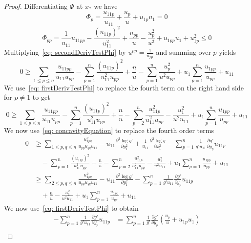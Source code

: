 \documentclass[10pt,a4paper]{amsart}
\newcommand{\del}{\partial}
\numberwithin{equation}{section}
\begin{document}
\begin{proof}
Differentiating $\Phi$ at $x_*$ we have
\begin{equation}\label{eq: firstDerivTestPhi}
\Phi_{p} = \frac{u_{11p}}{u_{11}} + \frac{u_p}{u} + u_{1p}u_1=0
\end{equation}
\begin{equation}\label{eq: secondDerivTestPhi}
 \Phi_{pp} = \frac{1}{u_{11}}u_{11pp}-\frac{(u_{11p})^2}{u_{11}^2} + \frac{u_{pp}}{u} - \frac{u_p^2}{u^2} + u_{1pp}u_1 + u_{1p}^2 \leq0
\end{equation}
Multiplying~\eqref{eq: secondDerivTestPhi} by $u^{pp}= \frac{1}{u_{pp}}$ and summing over $p$ yields
\[
0 \geq \sum_{1\leq p\leq n} \frac{u_{11pp}}{u_{11}u_{pp}}-\sum_{p=1}^{n}\frac{(u_{11p})^2}{u_{11}^2u_{pp}} + \frac{n}{u} - \sum_{p=1}^{n}\frac{u_p^2}{u^2u_{pp}} + u_{1}\sum_{p=1}^{n}\frac{u_{1pp}}{u_{pp}} + u_{11} 
\]
We use~\eqref{eq: firstDerivTestPhi} to replace the fourth term on the right hand side for $p\ne 1$ to get
\[
0 \geq \sum_{1\leq p\leq n} \frac{u_{11pp}}{u_{11}u_{pp}}-\sum_{p=1}^{n}\frac{(u_{11p})^2}{u_{11}^2u_{pp}} + \frac{n}{u} - \sum_{p=2}^{n}\frac{u_{11p}^2}{u_{11}^2u_{pp}}-\frac{u_1^2}{u^2u_{11}} + u_{1}\sum_{p=1}^{n}\frac{u_{1pp}}{u_{pp}} + u_{11}
\]
We now use~\eqref{eq: concavityEquation} to replace the fourth order terms
\begin{equation}\label{eq: PogorelovInequality1}
\begin{aligned}
  0 &\geq \sum_{1 \leq p,q\leq n}\frac{u_{1pq}^2} {u_{pp}u_{qq}u_{11}}-u_{11}\frac{\del^2 \log g'}{\del y_1^2}+\frac{1}{u_{11}}\frac{\del^2\log g}{\del x_1^2} -\sum_{p=1}^{n}\frac{1}{g'u_{11}}\frac{\del g'}{\del y_p}u_{11p} \\
  &\quad -\sum_{p=1}^{n}\frac{(u_{11p})^2}{u_{11}^2u_{pp}} + \frac{n}{u} - \sum_{p=2}^{n}\frac{u_{11p}^2}{u_{11}^2u_{pp}}-\frac{u_1^2}{u^2u_{11}} + u_{1}\sum_{p=1}^{n}\frac{u_{1pp}}{u_{pp}} + u_{11}\\
  &\geq \sum_{2 \leq p,q\leq n}\frac{u_{1pq}^2} {u_{pp}u_{qq}u_{11}}-u_{11}\frac{\del^2 \log g'}{\del y_1^2} -\sum_{p=1}^{n}\frac{1}{g'u_{11}}\frac{\del g'}{\del y_p}u_{11p} \\
  &\quad + \frac{n}{u} -\frac{u_1^2}{u^2u_{11}} + u_{1}\sum_{p=1}^{n}\frac{u_{1pp}}{u_{pp}} + u_{11}
\end{aligned}
\end{equation}
We now use~\eqref{eq: firstDerivTestPhi} to obtain
\[
\begin{aligned}
-\sum_{p=1}^{n}\frac{1}{g'u_{11}}\frac{\del g'}{\del y_p}u_{11p} &= \sum_{p=1}^{n}\frac{1}{g'}\frac{\del g'}{\del y_p}\left(\frac{u_{p}}{u}+u_{1p}u_1\right)\\

\end{aligned}\]
\end{proof}
\end{document}
